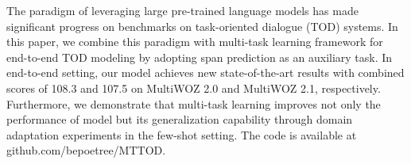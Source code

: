 The paradigm of leveraging large pre-trained language models has made significant progress on benchmarks on task-oriented dialogue (TOD) systems. In this paper, we combine this paradigm with multi-task learning framework for end-to-end TOD modeling by adopting span prediction as an auxiliary task. In end-to-end setting, our model achieves new state-of-the-art results with combined scores of 108.3 and 107.5 on MultiWOZ 2.0 and MultiWOZ 2.1, respectively. Furthermore, we demonstrate that multi-task learning improves not only the performance of model but its generalization capability through domain adaptation experiments in the few-shot setting. The code is available at github.com/bepoetree/MTTOD.
